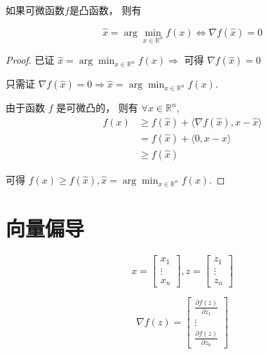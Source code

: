 \begin{theorem}
    如果可微函数$f$是凸函数， 则有

    \begin{equation} \hat{x}=\arg \min _{x \in \mathbb{R}^{n}} f(x) \Leftrightarrow \nabla f(\hat{x})=0 \end{equation}
\end{theorem}

\begin{proof}
    已证 $ \hat{x}=\arg \min _{x \in \mathbb{R}^{n}} f(x) \Rightarrow $ 可得 $ \nabla f(\hat{x})=0 $

    只需证 $ \nabla f(\hat{x})=0 \Rightarrow \hat{x}=\arg \min _{x \in \mathbb{R}^{n}} f(x) $.

    由于函数 $ f $ 是可微凸的， 则有 $ \forall x \in \mathbb{R}^{n} $,
\begin{equation}
\begin{aligned}
f(x) & \geq f(\hat{x})+\langle\nabla f(\hat{x}), x-\hat{x}\rangle \\
& = f(\hat{x})+\langle 0, x-\hat{x}\rangle 
\\ & \geq f(\hat{x})
\end{aligned}
\end{equation}

可得 $ f(x) \geq f(\hat{x}), \hat{x}=\arg \min _{x \in \mathbb{R}^{n}} f(x) $.
\end{proof}

\section{向量偏导}

\begin{definition}[向量对向量的导数]
    \label{Definition:VectorVectorDerivative}
    \begin{equation} x=\left[\begin{array}{c}x_{1} \\ \vdots \\ x_{n}\end{array}\right], z=\left[\begin{array}{c}z_{1} \\ \vdots \\ z_{n}\end{array}\right] \end{equation}

    \begin{equation} \nabla f(z)=\left[\begin{array}{c}\frac{\partial f(z)}{\partial z_{1}} \\ \vdots \\ \frac{\partial f(z)}{\partial z_{n}}\end{array}\right] \end{equation}
\end{definition}

